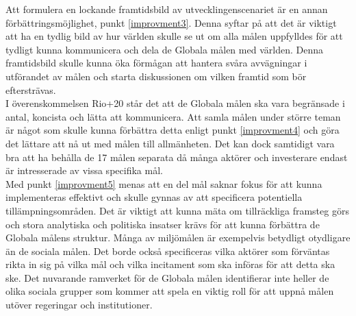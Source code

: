 \documentclass{report}
\begin{document}
Att formulera en lockande framtidsbild av utvecklingenscenariet är en annan förbättringsmöjlighet, punkt \ref{improvment3}. Denna syftar på att det är viktigt att ha en tydlig bild av hur världen skulle se ut om alla målen uppfylldes för att tydligt kunna kommunicera och dela de Globala målen med världen. Denna framtidsbild skulle kunna öka förmågan att hantera svåra avvägningar i utförandet av målen och starta diskussionen om vilken framtid som bör eftersträvas.\cite{webCostanza1}\\

I överenskommelsen Rio+20 står det att de Globala målen ska vara begränsade i antal, koncista och lätta att kommunicera. Att samla målen under större teman är något som skulle kunna förbättra detta enligt punkt \ref{improvment4} och göra det lättare att nå ut med målen till allmänheten. Det kan dock samtidigt vara bra att ha behålla de 17 målen separata då många aktörer och investerare endast är intresserade av vissa specifika mål. \cite{review}\\

Med punkt \ref{improvment5} menas att en del mål saknar fokus för att kunna implementeras effektivt och skulle gynnas av att specificera potentiella tillämpningsområden. Det är viktigt att kunna mäta om tillräckliga framsteg görs och stora analytiska och politiska insatser krävs för att kunna förbättra de Globala målens struktur. Många av miljömålen är exempelvis betydligt otydligare än de sociala målen. Det borde också specificeras vilka aktörer som förväntas rikta in sig på vilka mål och vilka incitament som ska införas för att detta ska ske. Det nuvarande ramverket för de Globala målen identifierar inte heller de olika sociala grupper som kommer att spela en viktig roll för att uppnå målen utöver regeringar och institutioner. \cite{review}\\



\newpage
\end{document}
